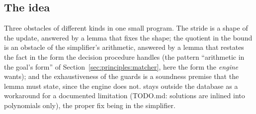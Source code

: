 \subsection{The idea}
Three obstacles of different kinds in one small program. The stride is a shape of the update, answered by a
lemma that fixes the shape; the quotient in the bound is an obstacle of the simplifier's arithmetic,
answered by a lemma that restates the fact in the form the decision procedure handles (the pattern
``arithmetic in the goal's form'' of Section~\ref{sec:principles:matcher}, here the form the \emph{engine}
wants); and the exhaustiveness of the guards is a soundness premise that the lemma must state, since the
engine does not.  stays outside the database as a workaround for a documented limitation
(TODO.md: solutions are inlined into polynomials only), the proper fix being in the simplifier.
